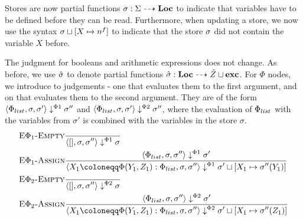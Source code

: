 Stores are now partial functions $\sigma : \Sigma \dashrightarrow \textbf{Loc}$ to indicate that
variables have to be defined before they can be read.
Furthermore, when updating a store, we now use the syntax 
$\sigma \sqcup [X \mapsto n^f{}]$ to indicate that the store $\sigma$ did not
contain the variable $X$ before.

The judgment for booleans and arithmetic expressions does not change.
As before, we use $\hat{\sigma}{}$ to denote partial functions
$\hat{\sigma}{}: \textbf{Loc} \dashrightarrow \tilde{Z} \sqcup \textbf{exc}$.
For $\Phi$ nodes, we introduce to judgements - one that evaluates them to the first argument,
and on that evaluates them to the second argument.
They are of the form $\langle \Phi_{list}, \sigma, \sigma' \rangle \downarrow^{\Phi1} \sigma''$ 
and $\langle \Phi_{list}, \sigma, \sigma' \rangle \downarrow^{\Phi2} \sigma''$,
where the evaluation of $\Phi_{list}$ with the variables from $\sigma'$
is combined with the variables in the store $\sigma$.
\begin{align*}
    &\bsrule{E$\Phi_1$-Empty}{}{\bigsteppl{[]}{\store}{\store''}{\store}}\\
    &\bsrule{E$\Phi_1$-Assign}
    {\bigsteppl{\defaultphilist}{\store}{\store''}{\store'}}
    {\bigsteppl{\phistore{X_1}{Y_1}{Z_1} : \defaultphilist}{\store}{\store''}{\storeassign{\store'}{X_1 \mapsto \store''(Y_1)}}}\\
    &\bsrule{E$\Phi_2$-Empty}{}{\bigsteppr{[]}{\store}{\store''}{\store}}\\
    &\bsrule{E$\Phi_2$-Assign}
    {\bigsteppr{\defaultphilist}{\store}{\store''}{\store'}}
    {\bigsteppr{\phistore{X_1}{Y_1}{Z_1} : \defaultphilist}{\store}{\store''}{\storeassign{\store'}{X_1 \mapsto \store''(Z_1)}}}\\
\end{align*}

